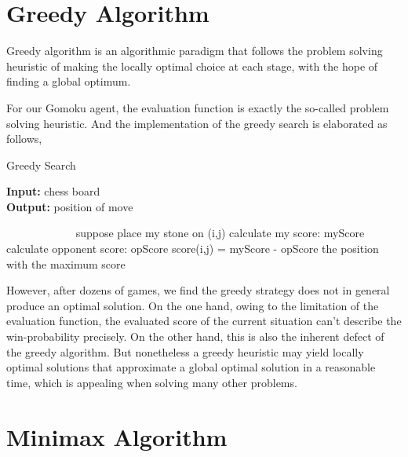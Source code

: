 \documentclass[11pt,a4paper]{article}
\begin{document}
\section{Greedy Algorithm}
Greedy algorithm is an algorithmic paradigm that follows the problem solving heuristic of making the locally optimal choice at each stage, with the hope of finding a global optimum.

For our Gomoku agent, the evaluation function is exactly the so-called problem solving heuristic.
And the implementation of the greedy search is elaborated as follows,
\begin{algorithm}[h]
\caption{Greedy Search}
\hspace*{0.02in} {\bf Input:} 
chess board\\
\hspace*{0.02in} {\bf Output:} 
position of move
\begin{algorithmic}
　　　　\State suppose place my stone on (i,j)
		\State calculate my score: myScore
        		\State calculate opponent score: opScore
        		\State score(i,j) = myScore - opScore
	\EndIf
\EndFor
\Return the position with the maximum score
\end{algorithmic}
\end{algorithm}

%
%

However, after dozens of games, we find the greedy strategy does not in general produce an optimal solution. On the one hand, owing to the limitation of the evaluation function, the evaluated score of the current situation can't describe the win-probability precisely. On the other hand, this is also the inherent defect of the greedy algorithm. But nonetheless a greedy heuristic may yield locally optimal solutions that approximate a global optimal solution in a reasonable time, which is appealing when solving many other problems.

\section{Minimax Algorithm}
\end{document}
